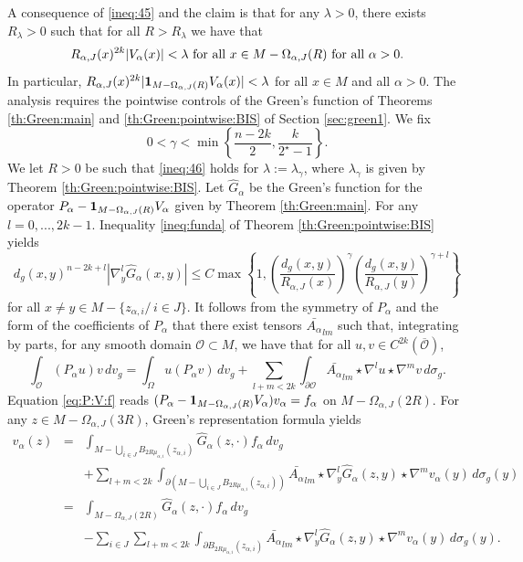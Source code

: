 \documentclass[reqno]{amsart}
\def \crit {2^\star}
\def \mai {\mu_{\alpha,i}}
\def \zai {z_{\alpha,i}}
\begin{document}
\medskip\noindent A consequence of \eqref{ineq:45} and the claim is that for any $\lambda>0$, there exists $R_\lambda>0$ such that for all $R>R_\lambda$ we have that
\begin{equation}\label{ineq:46}
R_{\alpha,J}(x)^{2k}|V_\alpha(x)|< \lambda\hbox{ for all }x\in M-\Omega_{\alpha,J}(R)\hbox{ for all }\alpha>0.
\end{equation}
In particular, $R_{\alpha,J}(x)^{2k}|{\bf 1}_{M-\Omega_{\alpha,J}(R)}V_\alpha(x)|< \lambda$ for all $x\in M$ and all $\alpha>0$. The analysis requires the pointwise controls of the Green's function of Theorems \ref{th:Green:main} and \ref{th:Green:pointwise:BIS} of Section \ref{sec:green1}. We fix $$0<\gamma<\min\left\{\frac{n-2k}{2},\frac{k}{\crit-1}\right\}.$$
We let $R>0$ be such that \eqref{ineq:46} holds for $\lambda:=\lambda_\gamma$, where $\lambda_\gamma$ is given by Theorem \ref{th:Green:pointwise:BIS}. Let $\hat{G}_\alpha$ be the Green's function for the operator $P_\alpha-  {\bf 1}_{M-\Omega_{\alpha,J}(R)}V_\alpha$ given by Theorem \ref{th:Green:main}. For any $l=0,...,2k-1$. Inequality \eqref{ineq:funda} of Theorem \ref{th:Green:pointwise:BIS}  yields
\begin{equation}\label{bnd:G:1}
d_g(x,y)^{n-2k+l}|\nabla_y^l \hat{G}_\alpha(x,y)|\leq C \max\left\{1, \left(\frac{d_g(x,y)}{R_{\alpha,J}(x)}\right)^\gamma \left(\frac{d_g(x,y)}{R_{\alpha,J}(y)}\right)^{\gamma+l} \right\}
\end{equation}
for all $x\neq y\in M-\{\zai/\, i\in J\}$. It follows from the symmetry of $P_\alpha$ and the form of the coefficients of $P_\alpha$ that there exist tensors $\bar{A_\alpha}_{lm}$ such that, integrating by parts, for any smooth domain ${\mathcal O}\subset M$, we have that for all $u,v\in C^{2k}(\overline{{\mathcal O}})$,
\begin{equation}\label{ipp:P}
\int_{\mathcal O} (P_\alpha u)v\, dv_g=\int_\Omega u(P_\alpha v)\, dv_g+\sum_{l+m<2k}\int_{\partial{\mathcal O}}\bar{A_\alpha}_{lm}\star\nabla^lu\star \nabla^m v\, d\sigma_g.
\end{equation}
Equation \eqref{eq:P:V:f} reads $(P_\alpha-{\bf 1}_{M-\Omega_{\alpha,J}(R)}V_\alpha)v_\alpha=f_\alpha$ on $M -   \Omega_{\alpha,J}(2R)$. For any $z\in  M-\Omega_{\alpha,J}(3R)$, Green's representation formula yields
\begin{eqnarray*}
v_\alpha(z)&=&\int_{M -  \bigcup_{i\in J}B_{2R\mai}(\zai)}\hat{G}_\alpha(z,\cdot) f_\alpha\, dv_g\\
&&+\sum_{l+m<2k}\int_{\partial(M -  \bigcup_{i\in J}B_{2R\mai}(\zai))}\bar{A_\alpha}_{lm}\star\nabla^l_y\hat{G}_\alpha(z,y)\star \nabla^m v_\alpha(y)\, d\sigma_g(y)\\
&=&\int_{M-\Omega_{\alpha,J}(2R)}\hat{G}_\alpha(z,\cdot) f_\alpha\, dv_g\\
&&-\sum_{i\in J}\sum_{l+m<2k}\int_{\partial B_{2R\mai}(\zai)}\bar{A_\alpha}_{lm}\star\nabla^l_y\hat{G}_\alpha(z,y)\star \nabla^m v_\alpha (y)\, d\sigma_g(y).
\end{eqnarray*}
\end{document}
